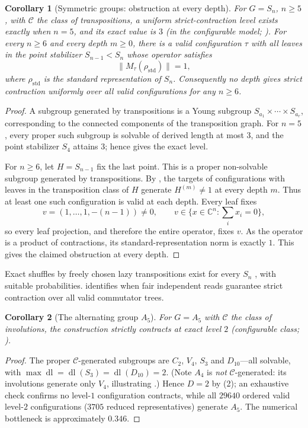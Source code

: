 \documentclass[11pt]{amsart}
\newtheorem{corollary}[corollary]{Corollary}
\theoremstyle{definition}
\theoremstyle{remark}
\theoremstyle{plain}
\theoremstyle{plain}
\numberwithin{equation}{section}
\newcommand{\norm}[1]{\lVert #1 \rVert}
\newcommand{\opn}[1]{\norm{#1}}
\newcommand{\C}{\mathbb{C}}
\begin{document}
\begin{corollary}[Symmetric groups: obstruction at every depth]
\label{cor:Sn}
For $G=S_n$, $n\ge5$, with $\mathcal{C}$ the class of transpositions,
a uniform strict-contraction level exists exactly when $n=5$, and its exact
value is $3$ (in the configurable model; ).
For every $n\ge6$ and every depth $m\ge0$, there is a valid configuration $\tau$
with all leaves in the point stabilizer $S_{n-1}<S_n$ whose operator satisfies
\[
 \opn{M_\tau(\rho_{\mathrm{std}})}=1,
\]
where $\rho_{\mathrm{std}}$ is the standard representation of $S_n$.
Consequently no depth gives strict contraction uniformly over all valid
configurations for any $n\ge6$.
\end{corollary}
\begin{proof}
A subgroup generated by transpositions is a Young subgroup $S_{a_1}\times\cdots\times
S_{a_r}$, corresponding to the connected components of the transposition
graph. For $n=5$, every proper such subgroup is solvable of derived length
at most $3$, and the point stabilizer $S_4$ attains $3$; hence
 gives the exact level.

For $n\ge6$, let $H=S_{n-1}$ fix the last point. This is a proper
non-solvable subgroup generated by transpositions. By ,
the targets of configurations with leaves in the transposition class of
$H$ generate $H^{(m)}\ne1$ at every depth $m$. Thus at least one such
configuration is valid at each depth. Every leaf fixes
\[
 v=(1,\ldots,1,-(n-1))\ne0,
 \qquad v\in\{x\in\C^n:\textstyle\sum_i x_i=0\},
\]
so every leaf projection, and therefore the entire operator, fixes $v$.
As the operator is a product of contractions, its standard-representation
norm is exactly $1$. This gives the claimed obstruction at every depth.
\end{proof}

Exact shuffles by freely chosen lazy transpositions exist for every $S_n$
\cite{AngelHolroyd2018}, with suitable probabilities.
 identifies when fair independent reads guarantee strict
contraction over all valid commutator trees.

\begin{corollary}[The alternating group $A_5$]
\label{cor:A5}
For $G=A_5$ with $\mathcal{C}$ the class of involutions, the construction strictly
contracts at exact level $2$ (configurable class; ).
\end{corollary}
\begin{proof}
The proper $\mathcal{C}$-generated subgroups are $C_2$, $V_4$, $S_3$ and $D_{10}$---all
solvable, with $\max\operatorname{dl}=\operatorname{dl}(S_3)=\operatorname{dl}(D_{10})=2$.
(Note $A_4$ is \emph{not} $\mathcal{C}$-generated: its involutions generate only $V_4$,
illustrating .) Hence $D=2$ by (2); an exhaustive check
confirms no level-$1$ configuration contracts, while all $29640$ ordered valid level-$2$ configurations
($3705$ reduced representatives) generate $A_5$. The numerical bottleneck is approximately $0.346$.
\end{proof}
\end{document}
